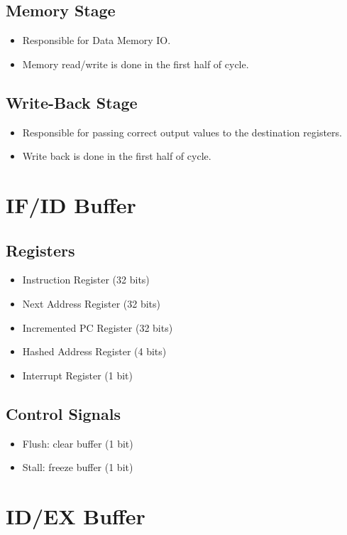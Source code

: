 \documentclass[12pt]{report}
\begin{document}
\subsection{Memory Stage}
\begin{itemize}
    \item Responsible for Data Memory IO.
    \item Memory read/write is done in the first half of cycle.
\end{itemize}

\subsection{Write-Back Stage}
\begin{itemize}
    \item Responsible for passing correct output values to the destination registers.
    \item Write back is done in the first half of cycle.
\end{itemize}

\section{IF/ID Buffer}

\subsection{Registers}
\begin{itemize}
    \item Instruction Register (32 bits)
    \item Next Address Register (32 bits)
    \item Incremented PC Register (32 bits)
    \item Hashed Address Register (4 bits)
    \item Interrupt Register (1 bit)
\end{itemize}

\subsection{Control Signals}
\begin{itemize}
    \item Flush: clear buffer (1 bit)
    \item Stall: freeze buffer (1 bit)
\end{itemize}

\section{ID/EX Buffer}
\end{document}
